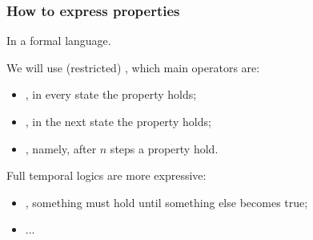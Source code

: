 \documentclass[usenames,dvipsnames]{beamer}
\begin{document}
\begin{frame}
  \frametitle{How to express properties}
 
  \begin{ntblock}
  
  \centering
In a formal language.
  \end{ntblock}
  
  \vfill

  We will use (restricted) , which main operators are:
  \begin{itemize}
  \item {}, in every state the property holds;
  \item {}, in the next state the property holds;
  \item {}, namely, after $n$ steps a property hold.
\end{itemize}

\vfill \pause

Full temporal logics are more expressive:
\begin{itemize}
\item {}, something must hold until something else becomes true;
\item ...
\end{itemize}

  
\end{frame}
\end{document}
